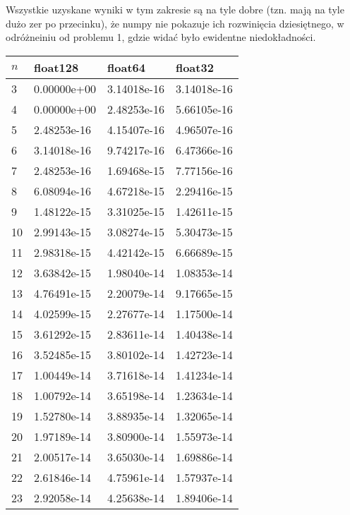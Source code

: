 \documentclass{article}
\begin{document}
Wszystkie uzyskane wyniki w tym zakresie są na tyle dobre (tzn. mają na tyle dużo zer po przecinku),
że numpy nie pokazuje ich rozwinięcia dziesiętnego, w odróżneiniu od problemu 1, gdzie widać było ewidentne
niedokładności.

\newpage
\thispagestyle{empty}

\begin{table}[H]
\parbox{.45\linewidth}{
\hspace*{-2.4cm}
\begin{tabular}{|l|l|l|l|}
\hline
$n$ & float128 & float64 & float32 \\ \hline
3 & 0.00000e+00 & 3.14018e-16 & 3.14018e-16 \\ \hline
4 & 0.00000e+00 & 2.48253e-16 & 5.66105e-16 \\ \hline
5 & 2.48253e-16 & 4.15407e-16 & 4.96507e-16 \\ \hline
6 & 3.14018e-16 & 9.74217e-16 & 6.47366e-16 \\ \hline
7 & 2.48253e-16 & 1.69468e-15 & 7.77156e-16 \\ \hline
8 & 6.08094e-16 & 4.67218e-15 & 2.29416e-15 \\ \hline
9 & 1.48122e-15 & 3.31025e-15 & 1.42611e-15 \\ \hline
10 & 2.99143e-15 & 3.08274e-15 & 5.30473e-15 \\ \hline
11 & 2.98318e-15 & 4.42142e-15 & 6.66689e-15 \\ \hline
12 & 3.63842e-15 & 1.98040e-14 & 1.08353e-14 \\ \hline
13 & 4.76491e-15 & 2.20079e-14 & 9.17665e-15 \\ \hline
14 & 4.02599e-15 & 2.27677e-14 & 1.17500e-14 \\ \hline
15 & 3.61292e-15 & 2.83611e-14 & 1.40438e-14 \\ \hline
16 & 3.52485e-15 & 3.80102e-14 & 1.42723e-14 \\ \hline
17 & 1.00449e-14 & 3.71618e-14 & 1.41234e-14 \\ \hline
18 & 1.00792e-14 & 3.65198e-14 & 1.23634e-14 \\ \hline
19 & 1.52780e-14 & 3.88935e-14 & 1.32065e-14 \\ \hline
20 & 1.97189e-14 & 3.80900e-14 & 1.55973e-14 \\ \hline
21 & 2.00517e-14 & 3.65030e-14 & 1.69886e-14 \\ \hline
22 & 2.61846e-14 & 4.75961e-14 & 1.57937e-14 \\ \hline
23 & 2.92058e-14 & 4.25638e-14 & 1.89406e-14 \\ \hline

\end{tabular}}
\end{table}
\end{document}

